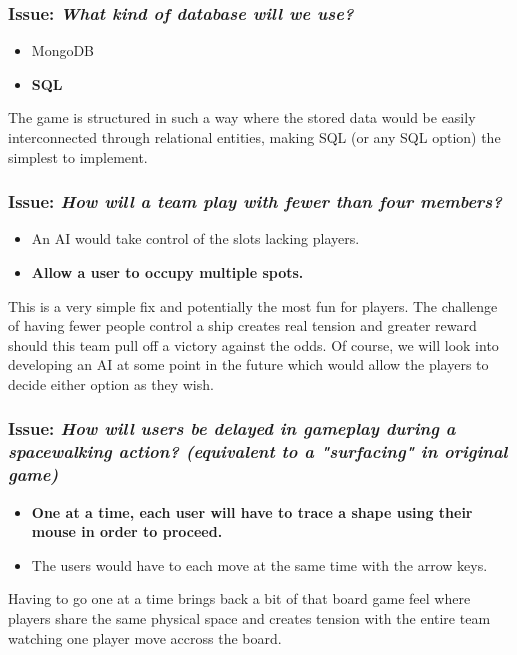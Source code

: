 \subsubsection*{Issue: \textit{What kind of database will we use?}}

  \begin{itemize}
    \item MongoDB
    \item \textbf{SQL}
  \end{itemize}

The game is structured in such a way where the stored data would be easily interconnected through relational entities, making SQL (or any SQL option) the simplest to implement.

\subsubsection*{Issue: \textit{How will a team play with fewer than four members?}}

  \begin{itemize}
    \item An AI would take control of the slots lacking players.
    \item \textbf{Allow a user to occupy multiple spots.}
  \end{itemize}

This is a very simple fix and potentially the most fun for players. The challenge of having fewer people control a ship creates real tension and greater reward should this team pull off a victory against the odds. Of course, we will look into developing an AI at some point in the future which would allow the players to decide either option as they wish.

\subsubsection*{Issue: \textit{How will users be delayed in gameplay during a spacewalking action? (equivalent to a "surfacing" in original game)}}

  \begin{itemize}
    \item \textbf{One at a time, each user will have to trace a shape using their mouse in order to proceed.}
    \item The users would have to each move at the same time with the arrow keys.
  \end{itemize}

Having to go one at a time brings back a bit of that board game feel where players share the same physical space and creates tension with the entire team watching one player move accross the board.

